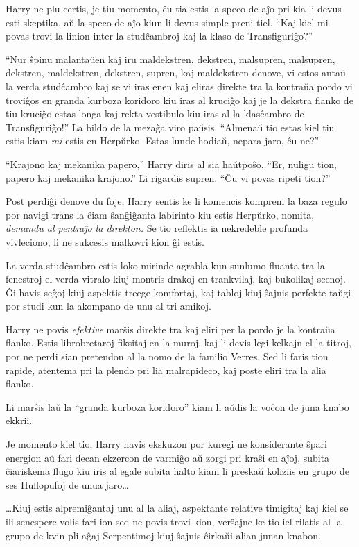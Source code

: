 Harry ne plu certis, je tiu momento, ĉu tia estis la speco de aĵo pri
kia li devus esti skeptika, aŭ la speco de aĵo kiun li devus simple
preni tiel. ``Kaj kiel mi povas trovi la linion inter la studĉambroj
kaj la klaso de Transfiguriĝo?''

``Nur ŝpinu malantaŭen kaj iru maldekstren, dekstren, malsupren,
malsupren, dekstren, maldekstren, dekstren, supren, kaj maldekstren
denove, vi estos antaŭ la verda studĉambro kaj se vi iras enen kaj
eliras direkte tra la kontraŭa pordo vi troviĝos en granda kurboza
koridoro kiu iras al kruciĝo kaj je la dekstra flanko de tiu kruciĝo
estas longa kaj rekta vestibulo kiu iras al la klasĉambro de
Transfiguriĝo!'' La bildo de la mezaĝa viro paŭsis. ``Almenaŭ tio
estas kiel tiu estis kiam \emph{mi} estis en Herpŭrko. Estas lunde
hodiaŭ, nepara jaro, ĉu ne?''

``Krajono kaj mekanika papero,'' Harry diris al sia haŭtpoŝo. ``Er,
nuligu tion, papero kaj mekanika krajono.'' Li rigardis supren. ``Ĉu
vi povas ripeti tion?''

Post perdiĝi denove du foje, Harry sentis ke li komencis kompreni la
baza regulo por navigi trans la ĉiam ŝanĝiĝanta labirinto kiu estis
Herpŭrko, nomita, \emph{demandu al pentraĵo la direkton.} Se tio
reflektis ia nekredeble profunda vivleciono, li ne sukcesis malkovri
kion ĝi estis.

La verda studĉambro estis loko mirinde agrabla kun sunlumo fluanta tra
la fenestroj el verda vitralo kiuj montris drakoj en trankvilaj, kaj
bukolikaj scenoj. Ĝi havis seĝoj kiuj aspektis treege komfortaj, kaj
tabloj kiuj ŝajnis perfekte taŭgi por studi kun la akompano de unu al
tri amikoj. 

Harry ne povis \emph{efektive} marŝis direkte tra kaj eliri per la
pordo je la kontraŭa flanko. Estis librobretaroj fiksitaj en la muroj,
kaj li devis legi kelkajn el la titroj, por ne perdi sian pretendon al
la nomo de la familio Verres. Sed li faris tion rapide, atentema pri
la plendo pri lia malrapideco, kaj poste eliri tra la alia flanko.

Li marŝis laŭ la ``granda kurboza koridoro'' kiam li aŭdis la voĉon de
juna knabo ekkrii.

Je momento kiel tio, Harry havis ekskuzon por kuregi ne konsiderante
ŝpari energion aŭ fari decan ekzercon de varmiĝo aŭ zorgi pri kraŝi en
aĵoj, subita ĉiariskema flugo kiu iris al egale subita halto kiam li
preskaŭ koliziis en grupo de ses Huflopufoj de unua jaro\ldots

\ldots Kiuj estis alpremiĝantaj unu al la aliaj, aspektante relative
timigitaj kaj kiel se ili senespere volis fari ion sed ne povis trovi
kion, verŝajne ke tio iel rilatis al la grupo de kvin pli aĝaj
Serpentimoj kiuj ŝajnis ĉirkaŭi alian junan knabon.

